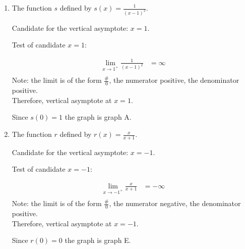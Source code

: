 \documentclass{ximera}
\begin{document}
\begin{problem}
\begin{enumerate}
    \item 
      The function $s$ defined by $\displaystyle s(x) = \frac{1}{(x-1)^2}$.
\begin{explanation}
        Candidate for the vertical asymptote: $x = 1$.

        Test of candidate $x = 1$:

        \begin{align*}
          \lim_{x \to 1^+} \frac{1}{(x-1)^2} &= \infty \\
              \end{align*}
	Note: the limit is of the form $ \frac{\#}{0}$, the numerator positive, the denominator positive.  \\
       Therefore, vertical asymptote at $x = 1$.
    
        Since $s(0) = 1$ the graph is graph A.        
      \end{explanation}


    \item
      The function $r$ defined by $\displaystyle r(x) = \frac{x}{x+1}$.
\begin{explanation}
        Candidate for the vertical asymptote: $x = -1$.

        Test of candidate $x = -1$:

        \begin{align*}
          \lim_{x \to -1^+} \frac{x}{x+1} &= -\infty \\
              \end{align*}
	Note:  the limit is of the form $ \frac{\#}{0} $, the numerator  negative, the denominator positive.\\
       Therefore, vertical asymptote at $x = -1$.
    
        Since $r(0) = 0$ the graph is graph E.
      \end{explanation}

  \end{enumerate}

\end{problem}
\end{document}

